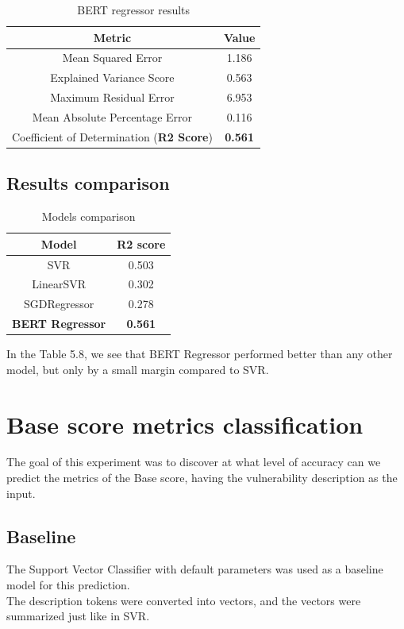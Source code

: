 \documentclass[times, utf8, zavrsni, english]{fer}
\begin{document}
\begin{table}[h!]
		\centering
		\begin{tabular}{|| c | c ||} 
			\hline
			Metric & Value \\ [0.5ex] 
			\hline\hline
			Mean Squared Error & 1.186  \\ \hline
			Explained Variance Score & 0.563\\ \hline
			Maximum Residual Error & 6.953 \\ \hline
			Mean Absolute Percentage Error & 0.116 \\ \hline
			Coefficient of Determination (\textbf{R2 Score}) & \textbf{0.561} \\
			\hline
		\end{tabular}
		\caption{BERT regressor results}
		\label{table:10}
\end{table}
\subsection{Results comparison}
\begin{table}[h!]
	\centering
	\begin{tabular}{|| c | c ||} 
		\hline
		Model & R2 score \\ [0.5ex] 
		\hline\hline
		SVR & 0.503  \\ \hline
		LinearSVR & 0.302 \\ \hline
		SGDRegressor & 0.278 \\ \hline
		\textbf{BERT Regressor} & \textbf{0.561} \\ 
	
		\hline
	\end{tabular}
	\caption{Models comparison}
	\label{table:11}
\end{table}

In the Table 5.8, we see that BERT Regressor performed better than any other model, but only by a small margin compared to SVR.

\section{Base score metrics classification}
The goal of this experiment was to discover at what level of accuracy can we predict the metrics of the Base score, having the vulnerability description as the input.
\subsection{Baseline}
The Support Vector Classifier with default parameters was used as a baseline model for this prediction.\\
The description tokens were converted into vectors, and the vectors were summarized just like in SVR.
\end{document}
